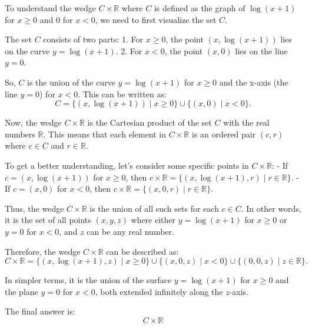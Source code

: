 To understand the wedge \( C \times \mathbb{R} \) where \( C \) is defined as the graph of \( \log(x+1) \) for \( x \geq 0 \) and \( 0 \) for \( x < 0 \), we need to first visualize the set \( C \).

The set \( C \) consists of two parts:
1. For \( x \geq 0 \), the point \((x, \log(x+1))\) lies on the curve \( y = \log(x+1) \).
2. For \( x < 0 \), the point \((x, 0)\) lies on the line \( y = 0 \).

So, \( C \) is the union of the curve \( y = \log(x+1) \) for \( x \geq 0 \) and the x-axis (the line \( y = 0 \)) for \( x < 0 \). This can be written as:
\[ C = \{(x, \log(x+1)) \mid x \geq 0\} \cup \{(x, 0) \mid x < 0\}. \]

Now, the wedge \( C \times \mathbb{R} \) is the Cartesian product of the set \( C \) with the real numbers \( \mathbb{R} \). This means that each element in \( C \times \mathbb{R} \) is an ordered pair \((c, r)\) where \( c \in C \) and \( r \in \mathbb{R} \).

To get a better understanding, let's consider some specific points in \( C \times \mathbb{R} \):
- If \( c = (x, \log(x+1)) \) for \( x \geq 0 \), then \( c \times \mathbb{R} = \{(x, \log(x+1), r) \mid r \in \mathbb{R}\} \).
- If \( c = (x, 0) \) for \( x < 0 \), then \( c \times \mathbb{R} = \{(x, 0, r) \mid r \in \mathbb{R}\} \).

Thus, the wedge \( C \times \mathbb{R} \) is the union of all such sets for each \( c \in C \). In other words, it is the set of all points \((x, y, z)\) where either \( y = \log(x+1) \) for \( x \geq 0 \) or \( y = 0 \) for \( x < 0 \), and \( z \) can be any real number.

Therefore, the wedge \( C \times \mathbb{R} \) can be described as:
\[ C \times \mathbb{R} = \{(x, \log(x+1), z) \mid x \geq 0\} \cup \{(x, 0, z) \mid x < 0\} \cup \{(0, 0, z) \mid z \in \mathbb{R}\}. \]

In simpler terms, it is the union of the surface \( y = \log(x+1) \) for \( x \geq 0 \) and the plane \( y = 0 \) for \( x < 0 \), both extended infinitely along the \( z \)-axis.

The final answer is:
\[ \boxed{C \times \mathbb{R}} \]